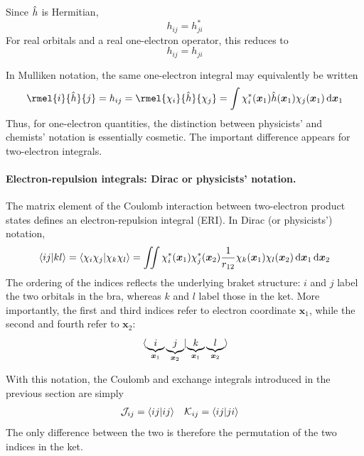 \documentclass[11pt,a4paper,titlepage]{article}
\numberwithin{equation}{section}
\newcommand{\bx}{\boldsymbol{x}}
\newcommand{\hh}{\Hat{h}}
\newcommand{\cJ}{\mathcal{J}}
\newcommand{\cK}{\mathcal{K}}
\begin{document}
Since $\hh$ is Hermitian,
\begin{equation}
  h_{ij}=h_{ji}^*
\end{equation}
For real orbitals and a real one-electron operator, this reduces to
\begin{equation}
  h_{ij}=h_{ji}
\end{equation}

In Mulliken notation, the same one-electron integral may equivalently be
written
\begin{equation}
  \rmel{i}{\hh}{j}
  =
  h_{ij}
  =
  \rmel{\chi_i}{\hh}{\chi_j}
  =
  \int
  \chi_i^*(\bx_1)
  \hh(\bx_1)
  \chi_j(\bx_1)
  \dd{\bx_1}
\end{equation}
Thus, for one-electron quantities, the distinction between physicists' and
chemists' notation is essentially cosmetic. The important difference appears
for two-electron integrals.

\paragraph{Electron-repulsion integrals: Dirac or physicists' notation.}

The matrix element of the Coulomb interaction between two-electron product
states defines an electron-repulsion integral (ERI). In Dirac (or physicists')
notation,
\begin{equation}
  \braket{ij}{kl}
  =
  \braket{\chi_i\chi_j}{\chi_k\chi_l}
  =
  \iint
  \chi_i^*(\bx_1)
  \chi_j^*(\bx_2)
  \frac{1}{r_{12}}
  \chi_k(\bx_1)
  \chi_l(\bx_2)
  \dd{\bx_1}\dd{\bx_2}
  \label{eq:eri-physicists}
\end{equation}
The ordering of the indices reflects the underlying braket structure:
$i$ and $j$ label the two orbitals in the bra, whereas $k$ and $l$ label
those in the ket. More importantly, the first and third indices refer to
electron coordinate $\bx_1$, while the second and fourth refer to $\bx_2$:
\begin{equation}
  \braket*{
    \underbrace{i}_{\bx_1}
    \underbrace{j}_{\bx_2}
  }{
    \underbrace{k}_{\bx_1}
    \underbrace{l}_{\bx_2}
  }
\end{equation}

With this notation, the Coulomb and exchange integrals introduced in the
previous section are simply
\begin{align}
  \cJ_{ij}&=\braket{ij}{ij}
  &
  \cK_{ij}&=\braket{ij}{ji}
  \label{eq:JK-physicists}
\end{align}
The only difference between the two is therefore the permutation of the two
indices in the ket.
\end{document}
